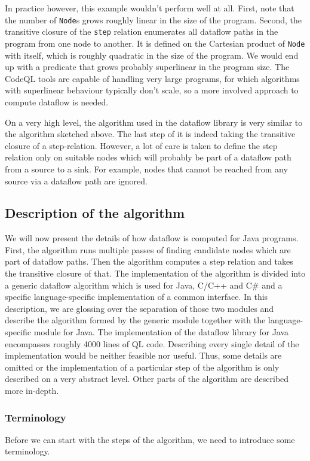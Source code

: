 In practice however, this example wouldn't perform well at all.
First, note that the number of \texttt{Node}s grows roughly linear in the size of
the program.
Second, the transitive closure of the \texttt{step} relation enumerates all dataflow
paths in the program from one node to another.
It is defined on the Cartesian product of \texttt{Node} with itself, which is roughly quadratic 
in the size of the program.
We would end up with a predicate that grows probably superlinear in the program size.
The CodeQL tools are capable of handling very large programs,
for which algorithms with superlinear behaviour typically don't scale,
so a more involved approach to compute dataflow is needed.

On a very high level, the algorithm used in the dataflow library is very similar 
to the algorithm sketched above.
The last step of it is indeed taking the transitive closure of a step-relation.
However, a lot of care is taken to define the step relation only on suitable 
nodes which will probably be part of a dataflow path from a source to a sink.
For example, nodes that cannot be reached from any source via a dataflow path 
are ignored.

\subsection{Description of the algorithm}
We will now present the details of how dataflow is computed for Java programs.
First, the algorithm runs multiple passes of finding candidate nodes which are part 
of dataflow paths.
Then the algorithm computes a step relation and takes the transitive closure of that.
The implementation of the algorithm is divided into a generic dataflow algorithm which is 
used for Java, C/C++ and C\# and a specific language-specific implementation of a common interface.
In this description, we are glossing over the separation of those two modules and 
describe the algorithm formed by the generic module together with the language-specific
module for Java.
The implementation of the dataflow library for Java encompasses roughly 4000 lines of
QL code. Describing every single detail of the implementation would be neither feasible nor 
useful. Thus, some details are omitted or the implementation of a particular step 
of the algorithm is only described on a very abstract level.
Other parts of the algorithm are described more in-depth.

\subsubsection*{Terminology}
Before we can start with the steps of the algorithm, we need to introduce some terminology.

